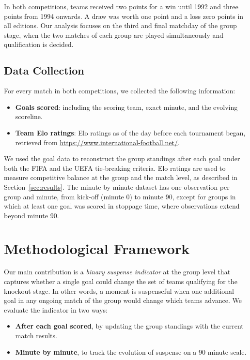 \documentclass[11pt]{article}
\begin{document}
In both competitions, teams received two points for a win until 1992 and three points from 1994 onwards. A draw was worth one point and a loss zero points in all editions. Our analysis focuses on the third and final matchday of the group stage, when the two matches of each group are played simultaneously and qualification is decided.


\subsection{Data Collection}

For every match in both competitions, we collected the following information:

\begin{itemize}
    \item \textbf{Goals scored}: including the scoring team, exact minute, and the evolving scoreline.
    \item \textbf{Team Elo ratings}: Elo ratings as of the day before each tournament began, retrieved from \url{https://www.international-football.net/}.
\end{itemize}

We used the goal data to reconstruct the group standings after each goal under both the FIFA and the UEFA tie-breaking criteria. Elo ratings are used to measure competitive balance at the group and the match level, as described in Section~\ref{sec:results}. The minute-by-minute dataset has one observation per group and minute, from kick-off (minute 0) to minute 90, except for groups in which at least one goal was scored in stoppage time, where observations extend beyond minute 90.


\section{Methodological Framework}
\label{sec:estimation}

Our main contribution is a \textit{binary suspense indicator} at the group level that captures whether a single goal could change the set of teams qualifying for the knockout stage. In other words, a moment is suspenseful when one additional goal in any ongoing match of the group would change which teams advance. We evaluate the indicator in two ways:

\begin{itemize}
    \item \textbf{After each goal scored}, by updating the group standings with the current match results.
    \item \textbf{Minute by minute}, to track the evolution of suspense on a 90-minute scale.
\end{itemize}
\end{document}
